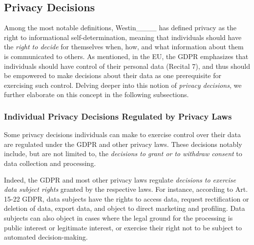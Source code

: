 


\subsection{Privacy Decisions}
\label{subsec:privacy_decisions}
Among the most notable definitions, Westin____ has defined privacy as the right to informational self-determination, meaning that individuals should have the \textit{right to decide} for themselves when, how, and what information about them is communicated to others.
As mentioned, in the EU, the GDPR emphasizes that individuals should have control of their personal data (Recital 7), and thus should be empowered to make decisions about their data as one prerequisite for exercising such control.
Delving deeper into this notion of \textit{privacy decisions}, we further elaborate on this concept in the following subsections.

\subsubsection{Individual Privacy Decisions Regulated by Privacy Laws}
Some privacy decisions individuals can make to exercise control over their data are regulated under the GDPR and other privacy laws. 
These decisions notably include, but are not limited to, the \textit{decisions to grant or to withdraw consent} to data collection and processing.

Indeed, the GDPR and most other privacy laws regulate \textit{decisions to exercise data subject rights} granted by the respective laws. 
For instance, according to Art. 15-22 GDPR, data subjects have the rights to access data, request rectification or deletion of data, export data, and object to direct marketing and profiling.
Data subjects can also object in cases where the legal ground for the processing is public interest or legitimate interest, or exercise their right not to be subject to automated decision-making.


